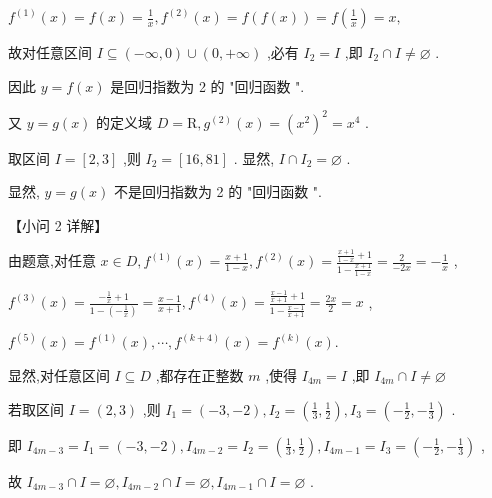 \documentclass[10pt]{article}
\begin{document}
\({f}^{\left( 1\right) }\left( x\right)  = f\left( x\right)  = \frac{1}{x},{f}^{\left( 2\right) }\left( x\right)  = f\left( {f\left( x\right) }\right)  = f\left( \frac{1}{x}\right)  = x,\)

故对任意区间 \(I \subseteq  \left( {-\infty ,0}\right)  \cup  \left( {0, + \infty }\right)\) ,必有 \({I}_{2} = I\) ,即 \({I}_{2} \cap  I \neq  \varnothing\) .

因此 \(y = f\left( x\right)\) 是回归指数为 2 的 "回归函数 ".

又 \(y = g\left( x\right)\) 的定义域 \(D = \mathrm{R},{g}^{\left( 2\right) }\left( x\right)  = {\left( {x}^{2}\right) }^{2} = {x}^{4}\) .

取区间 \(I = \left\lbrack  {2,3}\right\rbrack\) ,则 \({I}_{2} = \left\lbrack  {{16},{81}}\right\rbrack\) . 显然, \(I \cap  {I}_{2} = \varnothing\) .

显然, \(y = g\left( x\right)\) 不是回归指数为 2 的 "回归函数 ".

【小问 2 详解】

由题意,对任意 \(x \in  D,{f}^{\left( 1\right) }\left( x\right)  = \frac{x + 1}{1 - x},{f}^{\left( 2\right) }\left( x\right)  = \frac{\frac{x + 1}{1 - x} + 1}{1 - \frac{x + 1}{1 - x}} = \frac{2}{-{2x}} =  - \frac{1}{x}\) ,

\({f}^{\left( 3\right) }\left( x\right)  = \frac{-\frac{1}{x} + 1}{1 - \left( {-\frac{1}{x}}\right) } = \frac{x - 1}{x + 1},{f}^{\left( 4\right) }\left( x\right)  = \frac{\frac{x - 1}{x + 1} + 1}{1 - \frac{x - 1}{x + 1}} = \frac{2x}{2} = x\) ,

\({f}^{\left( 5\right) }\left( x\right)  = {f}^{\left( 1\right) }\left( x\right) ,\cdots ,{f}^{\left( k + 4\right) }\left( x\right)  = {f}^{\left( k\right) }\left( x\right) .\)

显然,对任意区间 \(I \subseteq  D\) ,都存在正整数 \(m\) ,使得 \({I}_{4m} = I\) ,即 \({I}_{4m} \cap  I \neq  \varnothing\)

若取区间 \(I = \left( {2,3}\right)\) ,则 \({I}_{1} = \left( {-3, - 2}\right) ,{I}_{2} = \left( {\frac{1}{3},\frac{1}{2}}\right) ,{I}_{3} = \left( {-\frac{1}{2}, - \frac{1}{3}}\right)\) .

即 \({I}_{{4m} - 3} = {I}_{1} = \left( {-3, - 2}\right) ,{I}_{{4m} - 2} = {I}_{2} = \left( {\frac{1}{3},\frac{1}{2}}\right) ,{I}_{{4m} - 1} = {I}_{3} = \left( {-\frac{1}{2}, - \frac{1}{3}}\right)\) ,

故 \({I}_{{4m} - 3} \cap  I = \varnothing ,{I}_{{4m} - 2} \cap  I = \varnothing ,{I}_{{4m} - 1} \cap  I = \varnothing\) .
\end{document}
